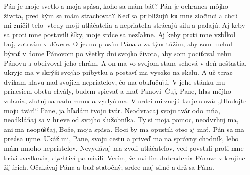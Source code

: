 Pán je moje svetlo a moja spása, koho sa mám báť?
\versseparator
Pán je ochranca môjho života, pred kým sa mám strachovať?
\versseparator
Keď sa približujú ku mne zločinci
a chcú mi zničiť telo,
\versseparator
vtedy moji utláčatelia a nepriatelia
strácajú silu a padajú.
\versseparator
Aj keby sa proti mne postavili šíky,
moje srdce sa nezľakne.
\versseparator
Aj keby proti mne vzbĺkol boj,
zotrvám v dôvere.
\versseparator
O jedno prosím Pána a za tým túžim,
aby som mohol bývať v dome Pánovom
po všetky dni svojho života,
\versseparator
aby som pociťoval nehu Pánovu
a obdivoval jeho chrám.
\versseparator
A on ma vo svojom stane schová
v deň nešťastia, ukryje ma v skrýši svojho príbytku
\versseparator
a postaví ma vysoko na skalu.
A už teraz dvíham hlavu
nad svojich nepriateľov, čo ma obkľučujú.
\versseparator
V jeho stánku mu prinesiem obetu chvály,
budem spievať a hrať Pánovi.
\versseparator
Čuj, Pane, hlas môjho volania,
zľutuj sa nado mnou a vyslyš ma.
\versseparator
V srdci mi znejú tvoje slová: „Hľadajte moju tvár!“
Pane, ja hľadám tvoju tvár.
\versseparator
Neodvracaj svoju tvár odo mňa,
neodkláňaj sa v hneve od svojho služobníka.
\versseparator
Ty si moja pomoc, neodvrhuj ma,
ani ma neopúšťaj, Bože, moja spása.
\versseparator
Hoci by ma opustili otec aj mať,
Pán sa ma predsa ujme.
\versseparator
Ukáž mi, Pane, svoju cestu
a priveď ma na správny chodník, lebo mám mnoho nepriateľov.
\versseparator
Nevydávaj ma zvoli utláčateľov,
veď povstali proti mne kriví svedkovia,
dychtiví po násilí.
\versseparator
Verím, že uvidím dobrodenia Pánove v krajine žijúcich.
\versseparator
Očakávaj Pána a buď statočný;
srdce maj silné a drž sa Pána. 
